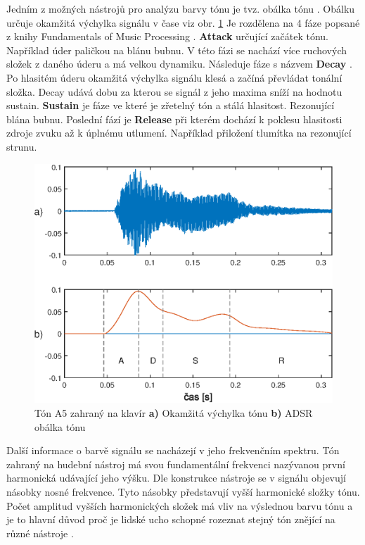   Jedním z možných nástrojů pro analýzu barvy tónu je tvz. obálka tónu .
  Obálku určuje okamžitá výchylka signálu v čase viz obr. \ref{fig:ADSR_envelope_on_piano_tone}
  Je rozdělena na 4 fáze popsané z knihy Fundamentals of Music Processing \cite{fundamental_of_music_processing}.
  \textbf{Attack } určující začátek tónu. Například úder paličkou na blánu bubnu.
  V této fázi se nachází více ruchových složek z daného úderu a má velkou dynamiku.
  Následuje fáze s názvem \textbf{Decay }.
  Po hlasitém úderu okamžitá výchylka signálu klesá a začíná převládat tonální složka. Decay udává dobu za kterou se signál z jeho maxima sníží na hodnotu sustain.
  \textbf{Sustain } je fáze ve které je zřetelný tón a stálá hlasitost. Rezonující blána bubnu.
  Poslední fází je \textbf{Release } při kterém dochází k poklesu hlasitosti zdroje zvuku až k úplnému utlumení.
  Například přiložení tlumítka na rezonující strunu.

  \begin{figure}[H]
    \centering
    \includegraphics[width = 0.8\linewidth]{obrazky/ADSR.eps}
    \caption{Tón A5 zahraný na klavír \textbf{a)} Okamžitá výchylka tónu \textbf{b)} ADSR obálka tónu}
    \label{fig:ADSR_envelope_on_piano_tone}
  \end{figure}

  Další informace o barvě signálu se nacházejí v jeho frekvenčním spektru. 
  Tón zahraný na hudební nástroj má svou fundamentální  frekvenci nazývanou první harmonická udávající jeho výšku.
  Dle konstrukce nástroje se v signálu objevují násobky nosné frekvence.
  Tyto násobky představují vyšší harmonické složky tónu.
  Počet amplitud vyšších harmonických složek má vliv na výslednou barvu tónu a je to hlavní důvod proč je lidské ucho schopné rozeznat stejný tón znějící na různé nástroje \cite{Musical_timbre_perception}.

